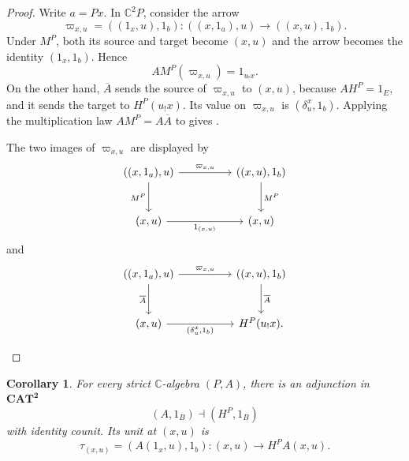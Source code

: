 \documentclass[11pt]{article}
\theoremstyle{plain}
\newtheorem{corollary}[theorem]{Corollary}
\theoremstyle{definition}
\theoremstyle{remark}
\newcommand{\CAT}{\mathbf{CAT}}
\newcommand{\C}{\mathbb{C}}
\numberwithin{equation}{section}
\begin{document}
\begin{proof}
Write $a=Px$.  In $\C^2P$, consider the arrow
\begin{equation}
\varpi_{x,u}=((1_x,u),1_b)
  \colon ((x,1_a),u)\longrightarrow((x,u),1_b).
  \label{eq:absorption-test-arrow}
\end{equation}
Under $M^{P}$, both its source and target become $(x,u)$ and the
arrow becomes the identity $(1_x,1_b)$.  Hence
\begin{equation*}
AM^{P}(\varpi_{x,u})=1_{u_{!}x}.
\end{equation*}
On the other hand, $\overline A$ sends the source of
$\varpi_{x,u}$ to $(x,u)$, because $AH^{P}=1_E$, and it sends the
target to $H^{P}(u_{!}x)$.  Its value on $\varpi_{x,u}$ is
$(\delta^{x}_{u},1_b)$.  Applying the multiplication law
$AM^{P}=A\overline A$ to  gives
.
\begin{samepage}
The two images of $\varpi_{x,u}$ are displayed by
\begin{equation*}
\begin{tikzcd}[column sep=huge,row sep=large]
((x,1_a),u) \arrow[r,"\varpi_{x,u}"] \arrow[d,"M^P"']
  & ((x,u),1_b) \arrow[d,"M^P"] \\
(x,u) \arrow[r,"1_{(x,u)}"'] & (x,u)
\end{tikzcd}
\end{equation*}
and
\begin{equation*}
\begin{tikzcd}[column sep=huge,row sep=large]
((x,1_a),u) \arrow[r,"\varpi_{x,u}"] \arrow[d,"{\overline A}"']
  & ((x,u),1_b) \arrow[d,"{\overline A}"] \\
(x,u) \arrow[r,"{(\delta^x_u,1_b)}"'] & H^P(u_!x).
\end{tikzcd}
\end{equation*}
\end{samepage}
\end{proof}

\begin{corollary}\label{cor:algebra-adjunction}
For every strict $\C$-algebra $(P,A)$, there is an adjunction in
$\CAT^{\mathbf 2}$
\begin{equation}
  (A,1_B)\dashv(H^{P},1_B)
  \label{eq:algebra-adjunction}
\end{equation}
with identity counit.  Its unit at $(x,u)$ is
\begin{equation}
  \tau_{(x,u)}=(A(1_x,u),1_b)
  \colon(x,u)\longrightarrow H^{P}A(x,u).
  \label{eq:algebra-adjunction-unit}
\end{equation}
\end{corollary}
\end{document}
